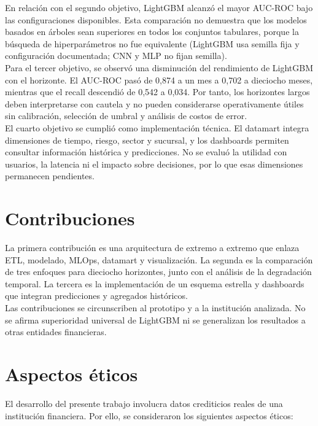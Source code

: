 En relación con el segundo objetivo, LightGBM alcanzó el mayor AUC-ROC bajo las configuraciones disponibles. Esta comparación no demuestra que los modelos basados en árboles sean superiores en todos los conjuntos tabulares, porque la búsqueda de hiperparámetros no fue equivalente (LightGBM usa semilla fija y configuración documentada; CNN y MLP no fijan semilla).\\

Para el tercer objetivo, se observó una disminución del rendimiento de LightGBM con el horizonte. El AUC-ROC pasó de 0,874 a un mes a 0,702 a dieciocho meses, mientras que el recall descendió de 0,542 a 0,034. Por tanto, los horizontes largos deben interpretarse con cautela y no pueden considerarse operativamente útiles sin calibración, selección de umbral y análisis de costos de error.\\

El cuarto objetivo se cumplió como implementación técnica. El datamart integra dimensiones de tiempo, riesgo, sector y sucursal, y los dashboards permiten consultar información histórica y predicciones. No se evaluó la utilidad con usuarios, la latencia ni el impacto sobre decisiones, por lo que esas dimensiones permanecen pendientes.

\section{Contribuciones}

La primera contribución es una arquitectura de extremo a extremo que enlaza ETL, modelado, MLOps, datamart y visualización. La segunda es la comparación de tres enfoques para dieciocho horizontes, junto con el análisis de la degradación temporal. La tercera es la implementación de un esquema estrella y dashboards que integran predicciones y agregados históricos.\\

Las contribuciones se circunscriben al prototipo y a la institución analizada. No se afirma superioridad universal de LightGBM ni se generalizan los resultados a otras entidades financieras.

\section{Aspectos éticos}

El desarrollo del presente trabajo involucra datos crediticios reales de una institución financiera. Por ello, se consideraron los siguientes aspectos éticos:

